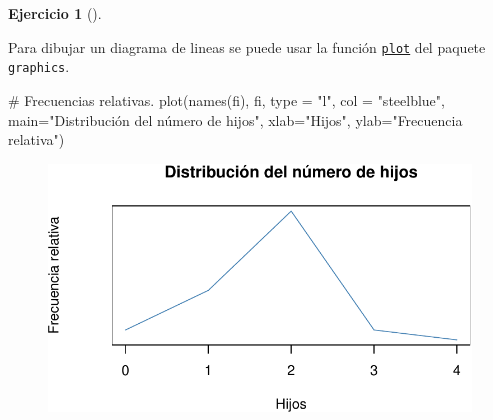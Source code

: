 \documentclass[
  a4paper,
]{scrreport}
\newenvironment{Shaded}{\begin{snugshade}}{\end{snugshade}}
\newcommand{\AttributeTok}[1]{\textcolor[rgb]{0.40,0.45,0.13}{#1}}
\newcommand{\CommentTok}[1]{\textcolor[rgb]{0.37,0.37,0.37}{#1}}
\newcommand{\FunctionTok}[1]{\textcolor[rgb]{0.28,0.35,0.67}{#1}}
\newcommand{\NormalTok}[1]{\textcolor[rgb]{0.00,0.23,0.31}{#1}}
\newcommand{\StringTok}[1]{\textcolor[rgb]{0.13,0.47,0.30}{#1}}
\theoremstyle{definition}
\newtheorem{exercise}{Ejercicio}[chapter]
\theoremstyle{remark}
\begin{document}
\begin{exercise}[]
\begin{tcolorbox}[enhanced jigsaw, coltitle=black, breakable, bottomtitle=1mm, colbacktitle=quarto-callout-tip-color!10!white, rightrule=.15mm, opacityback=0, opacitybacktitle=0.6, left=2mm, colframe=quarto-callout-tip-color-frame, title=\textcolor{quarto-callout-tip-color}{\faLightbulb}\hspace{0.5em}{Solución 1}, toprule=.15mm, toptitle=1mm, arc=.35mm, colback=white, titlerule=0mm, bottomrule=.15mm, leftrule=.75mm]

Para dibujar un diagrama de lineas se puede usar la función
\href{https://www.rdocumentation.org/packages/graphics/versions/3.6.2/topics/plot}{\texttt{plot}}
del paquete \texttt{graphics}.

\begin{Shaded}
\begin{Highlighting}[]
\CommentTok{\# Frecuencias relativas.}
\FunctionTok{plot}\NormalTok{(}\FunctionTok{names}\NormalTok{(fi), fi, }\AttributeTok{type =} \StringTok{"l"}\NormalTok{, }\AttributeTok{col =} \StringTok{"steelblue"}\NormalTok{, }\AttributeTok{main=}\StringTok{"Distribución del número de hijos"}\NormalTok{, }\AttributeTok{xlab=}\StringTok{"Hijos"}\NormalTok{, }\AttributeTok{ylab=}\StringTok{"Frecuencia relativa"}\NormalTok{)}
\end{Highlighting}
\end{Shaded}

\begin{figure}[H]

{\centering \includegraphics{./03-frecuencias-graficos_files/figure-pdf/unnamed-chunk-8-1.pdf}

}

\end{figure}

\end{tcolorbox}


\end{exercise}
\end{document}
